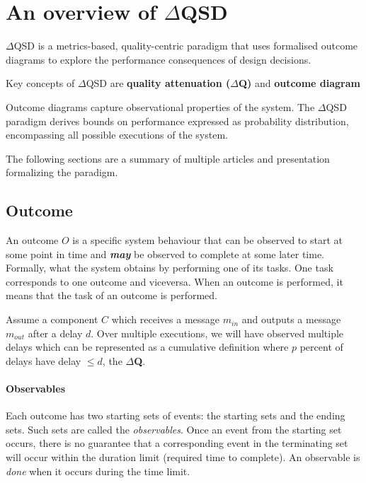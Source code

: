 \section{An overview of $\Delta$QSD}
    $\Delta$QSD is a metrics-based, quality-centric paradigm that uses formalised outcome diagrams to explore the performance consequences of design decisions. \cite{myo}
    
    Key concepts of $\Delta$QSD are \textbf{quality attenuation ($\Delta$Q)} and \textbf{outcome diagram}

    Outcome diagrams capture observational properties of the system. The $\Delta$QSD paradigm derives bounds on performance expressed as probability distribution, encompassing all possible executions of the system. 
 
    The following sections are a summary of multiple articles and presentation formalizing the paradigm. \cite{myo} \cite{dq-tut} \cite{art} \cite{dq-br} 
     
 \subsection{Outcome}
           An outcome $O$ is a specific system behaviour that can be observed to start at some point in time and \textit{\textbf{may}} be observed to complete at some later time. \cite{dq-br}
        Formally, what the system obtains by performing one of its tasks. One task corresponds to one outcome and viceversa. When an outcome is performed, it means that the task of an outcome is performed.
     
     Assume a component $C$ which receives a message $m_{in}$ and outputs a message $m_{out}$ after a delay $d$. Over multiple executions, we will have observed multiple delays which can be represented as a cumulative definition where $p$ percent of delays have delay $\le d$, the \textbf{$\Delta$Q}. \cite{art} 


    \paragraph{Observables}
    Each outcome has two starting sets of events: the starting sets and the ending sets. Such sets are called the \textit{observables}. Once an event from the starting set occurs, there is no guarantee that a corresponding event in the terminating set will occur within the duration limit (required time to complete). An observable is \textit{done}  when it occurs during the time limit.

